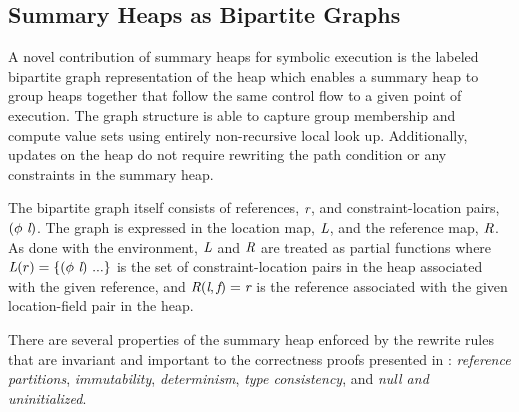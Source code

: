 \subsection{Summary Heaps as Bipartite Graphs}
A novel contribution of summary heaps for symbolic execution is the
labeled bipartite graph representation of the heap which enables a
summary heap to group heaps together that follow the same control flow
to a given point of execution. The graph structure is able to capture
group membership and compute value sets using entirely non-recursive
local look up. Additionally, updates on the heap do not require
rewriting the path condition or any constraints in the summary heap.

The bipartite graph itself consists of references, $\emph{r}$, and
constraint-location pairs, $(\phi\ \emph{l})$. The graph is
expressed in the location map, $\emph{L}$, and the reference map,
$\emph{R}$. As done with the environment, $\emph{L}$ and $\emph{R}$
are treated as partial functions where $\emph{L}(r) =
\{(\phi\ \emph{l})\ ...\}$ is the set of constraint-location pairs in
the heap associated with the given reference, and
$\emph{R}(\emph{l},\emph{f}) = \emph{r}$ is the reference
associated with the given location-field pair in the heap.  

There are several properties of the summary heap enforced by the
rewrite rules that are invariant and important to the correctness
proofs presented in : \emph{reference partitions},
\emph{immutability}, \emph{determinism}, \emph{type
  consistency}, and \emph{null and uninitialized}.

